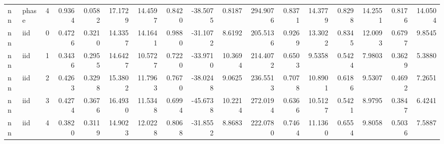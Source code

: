\begin{tabular}{llrrrrrrrrrrrrrrr}
nn & phase & 4 & 0.9364 & 0.0582 & 17.1729 & 14.4597 & 0.8420 & -38.5075 & 0.8187 & 294.9076 & 0.8371 & 14.3779 & 0.8298 & 14.2551 & 0.8176 & 14.0504 \\
nn & iid & 0 & 0.4726 & 0.3210 & 14.3357 & 14.1641 & 0.9880 & -31.1072 & 8.6192 & 205.5136 & 0.9269 & 13.3022 & 0.8345 & 12.0093 & 0.6797 & 9.8545 \\
nn & iid & 1 & 0.3436 & 0.2955 & 14.6427 & 10.5727 & 0.7220 & -33.9710 & 10.3694 & 214.4072 & 0.6503 & 9.5358 & 0.5424 & 7.9803 & 0.3629 & 5.3880 \\
nn & iid & 2 & 0.4263 & 0.3298 & 15.3802 & 11.7963 & 0.7670 & -38.0248 & 9.0625 & 236.5513 & 0.7078 & 10.8901 & 0.6186 & 9.5307 & 0.4692 & 7.2651 \\
nn & iid & 3 & 0.4274 & 0.3676 & 16.4930 & 11.5348 & 0.6994 & -45.6738 & 10.2214 & 272.0194 & 0.6366 & 10.5127 & 0.5421 & 8.9795 & 0.3847 & 6.4241 \\
nn & iid & 4 & 0.3820 & 0.3119 & 14.9023 & 12.0228 & 0.8068 & -31.8552 & 8.8683 & 222.0780 & 0.7464 & 11.1360 & 0.6554 & 9.8058 & 0.5036 & 7.5887 \\
\bottomrule
\end{tabular}

